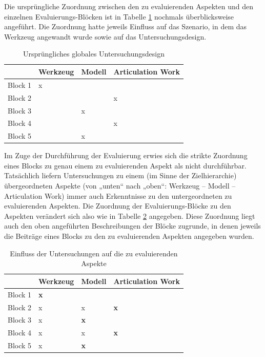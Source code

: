 Die ursprüngliche Zuordnung zwischen den zu evaluierenden Aspekten und den einzelnen Evaluierungs-Blöcken ist in Tabelle \ref{tab:evaluierungsMatrixOriginal} nochmals überblicksweise angeführt. Die Zuordnung hatte jeweils Einfluss auf das Szenario, in dem das Werkzeug angewandt wurde sowie auf das Untersuchungsdesign.

\begin{table}[htbp]
	\centering
	\caption{Ursprüngliches globales Untersuchungsdesign}
	\begin{tabular}{| p{3cm} || p{2cm} | p{2cm} | p{2cm} |} \hline
		 & Werkzeug & Modell & Articulation Work \\ \hline \hline
		 Block 1 & x &  &   \\ \hline
		 Block 2 &  &  & x  \\ \hline
		 Block 3 &  & x &   \\ \hline
		 Block 4 &  &  & x  \\ \hline
		 Block 5 &  & x &   \\ \hline
	\end{tabular}
	\label{tab:evaluierungsMatrixOriginal}
\end{table}

Im Zuge der Durchführung der Evaluierung erwies sich die strikte Zuordnung eines Blocks zu genau einem zu evaluierenden Aspekt als nicht durchführbar. Tatsächlich liefern Untersuchungen zu einem (im Sinne der Zielhierarchie) übergeordneten Aspekte (von „unten“ nach „oben“: Werkzeug -- Modell -- Articulation Work) immer auch Erkenntnisse zu den untergeordneten zu evaluierenden Aspekten. Die Zuordnung der Evaluierungs-Blöcke zu den Aspekten verändert sich also wie in Tabelle \ref{tab:evaluierungsMatrix} angegeben. Diese Zuordnung liegt auch den oben angeführten Beschreibungen der Blöcke zugrunde, in denen jeweils die Beiträge eines Blocks zu den zu evaluierenden Aspekten angegeben wurden.

\begin{table}[htbp]
	\centering
	\caption{Einfluss der Untersuchungen auf die zu evaluierenden Aspekte}
	\begin{tabular}{| p{3cm} || p{2cm} | p{2cm} | p{2cm} |} \hline
		 & Werkzeug & Modell & Articulation Work \\ \hline \hline
		 Block 1 & \textbf{x} &  &   \\ \hline
		 Block 2 & x & x & \textbf{x}  \\ \hline
		 Block 3 & x & \textbf{x} &   \\ \hline
		 Block 4 & x & x & \textbf{x}  \\ \hline
		 Block 5 & x & \textbf{x} &   \\ \hline
	\end{tabular}
	\label{tab:evaluierungsMatrix}
\end{table}


